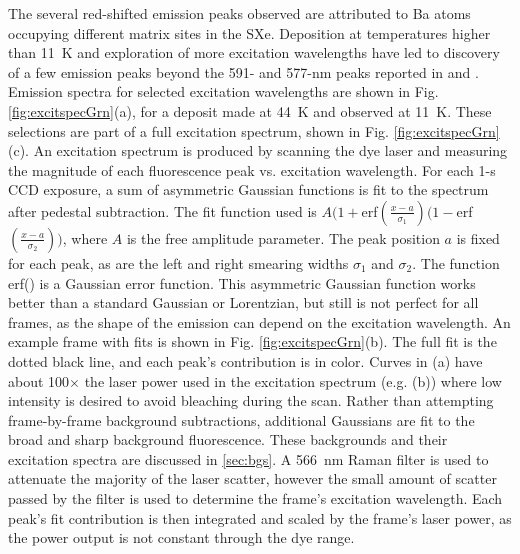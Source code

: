 
The several red-shifted emission peaks observed are attributed to Ba atoms occupying different matrix sites in the SXe.  Deposition at temperatures higher than 11~K and exploration of more excitation wavelengths have led to discovery of a few emission peaks beyond the 591- and 577-nm peaks reported in \cite{Shon} and \cite{Brian}.  Emission spectra for selected excitation wavelengths are shown in Fig. \ref{fig:excitspecGrn}(a), for a deposit made at 44~K and observed at 11~K.  These selections are part of a full excitation spectrum, shown in Fig. \ref{fig:excitspecGrn}(c).  An excitation spectrum is produced by scanning the dye laser and measuring the magnitude of each fluorescence peak vs. excitation wavelength.  For each 1-s CCD exposure, a sum of asymmetric Gaussian functions is fit to the spectrum after pedestal subtraction.  The fit function used is $A(1+$erf$(\frac{x-a}{\sigma_{1}})(1-$erf$(\frac{x-a}{\sigma_{2}}))$, where $A$ is the free amplitude parameter.  The peak position $a$ is fixed for each peak, as are the left and right smearing widths $\sigma_{1}$ and $\sigma_{2}$.  The function erf() is a Gaussian error function.  This asymmetric Gaussian function works better than a standard Gaussian or Lorentzian, but still is not perfect for all frames, as the shape of the emission can depend on the excitation wavelength.  An example frame with fits is shown in Fig. \ref{fig:excitspecGrn}(b).  The full fit is the dotted black line, and each peak's contribution is in color.  Curves in (a) have about 100$\times$ the laser power used in the excitation spectrum (e.g. (b)) where low intensity is desired to avoid bleaching during the scan.  Rather than attempting frame-by-frame background subtractions, additional Gaussians are fit to the broad and sharp background fluorescence.  These backgrounds and their excitation spectra are discussed in \ref{sec:bgs}.  A 566~nm Raman filter is used to attenuate the majority of the laser scatter, however the small amount of scatter passed by the filter is used to determine the frame's excitation wavelength.  Each peak's fit contribution is then integrated and scaled by the frame's laser power, as the power output is not constant through the dye range.


